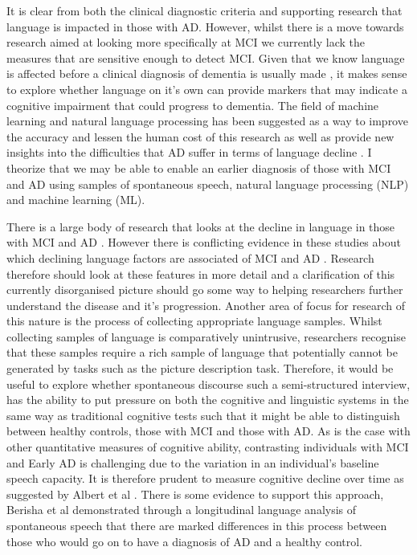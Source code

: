 \par
It is clear from both the clinical diagnostic criteria and supporting research that language is impacted in those with AD. However, whilst there is a move towards research aimed at looking more specifically at MCI we currently lack the measures that are sensitive enough to detect MCI. Given that we know language is affected before a clinical diagnosis of dementia is usually made \cite{Berisha2015, Snowdon1996, Le2011}, it makes sense to explore whether language on it's own can provide markers that may indicate a cognitive impairment that could progress to dementia. The field of machine learning and natural language processing has been suggested as a way to improve the accuracy and lessen the human cost of this research as well as provide new insights into the difficulties that AD suffer in terms of language decline \cite{Boschi2017}. I theorize that we may be able to enable an earlier diagnosis of those with MCI and AD using samples of spontaneous speech, natural language processing (NLP) and machine learning (ML).
\par
There is a large body of research that looks at the decline in language in those with MCI and AD \cite{Taler2008, Boschi2017}. However there is conflicting evidence in these studies about which declining language factors are associated of MCI and AD \cite{Taler2008, Boschi2017}. Research therefore should look at these features in more detail and a clarification of this currently disorganised picture should go some way to helping researchers further understand the disease and it's progression. Another area of focus for research of this nature is the process of collecting appropriate language samples. Whilst collecting samples of language is comparatively unintrusive, researchers recognise that these samples require a rich sample of language that potentially cannot be generated by tasks such as the picture description task. Therefore, it would be useful to explore whether spontaneous discourse such a semi-structured interview, has the ability to put pressure on both the cognitive and linguistic systems in the same way as traditional cognitive tests such that it might be able to distinguish between healthy controls, those with MCI and those with AD. As is the case with other quantitative measures of cognitive ability, contrasting individuals with MCI and Early AD is challenging due to the variation in an individual's baseline speech capacity. It is therefore prudent to measure cognitive decline over time as suggested by Albert et al \cite{Albert2011}. There is some evidence to support this approach, Berisha et al \cite{Berisha2015} demonstrated through a longitudinal language analysis of spontaneous speech that there are marked differences in this process between those who would go on to have a diagnosis of AD and a healthy control. 
\par
